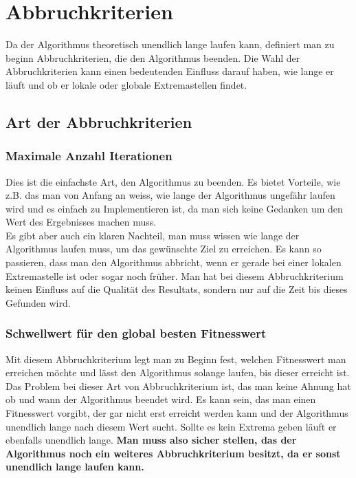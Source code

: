 \section{Abbruchkriterien}

Da der Algorithmus theoretisch unendlich lange laufen kann, definiert man zu beginn Abbruchkriterien, die den Algorithmus beenden.
Die Wahl der Abbruchkriterien kann einen bedeutenden Einfluss darauf haben, wie lange er läuft und ob er lokale oder globale Extremastellen findet.

\subsection{Art der Abbruchkriterien}

\subsubsection{Maximale Anzahl Iterationen}
Dies ist die einfachste Art, den Algorithmus zu beenden. Es bietet Vorteile, wie z.B. das man von Anfang an weiss, wie lange der Algorithmus ungefähr laufen wird und es einfach zu Implementieren ist, da man sich keine Gedanken um den Wert des Ergebnisses machen muss. \\
Es gibt aber auch ein klaren Nachteil, man muss wissen wie lange der Algorithmus laufen muss, um das gewünschte Ziel zu erreichen. Es kann so passieren, dass man den Algorithmus abbricht, wenn er gerade bei einer lokalen Extremastelle ist oder sogar noch früher. Man hat bei diesem Abbruchkriterium keinen Einfluss auf die Qualität des Resultats, sondern nur auf die Zeit bis dieses Gefunden wird.

\subsubsection{Schwellwert für den global besten Fitnesswert}
Mit diesem Abbruchkriterium legt man zu Beginn fest, welchen Fitnesswert man erreichen möchte und lässt den Algorithmus solange laufen, bis dieser erreicht ist.\\
Das Problem bei dieser Art von Abbruchkriterium ist, das man keine Ahnung hat ob und wann der Algorithmus beendet wird. Es kann sein, das man einen Fitnesswert vorgibt, der gar nicht erst erreicht werden kann und der Algorithmus unendlich lange nach diesem Wert sucht. Sollte es kein Extrema geben läuft er ebenfalls unendlich lange. \textbf{Man muss also sicher stellen, das der Algorithmus noch ein weiteres Abbruchkriterium besitzt, da er sonst unendlich lange laufen kann.}

